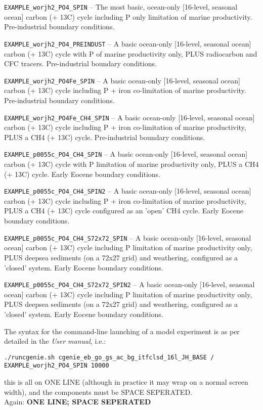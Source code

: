 \documentclass[10pt,twoside]{article}
\begin{document}
\begin{compactenum}

\item \texttt{EXAMPLE\_worjh2\_PO4\_SPIN} -- The most basic, ocean-only [16-level, seasonal ocean] carbon (+ 13C) cycle including P only limitation of marine productivity. Pre-industrial boundary conditions.
\item \texttt{EXAMPLE\_worjh2\_PO4\_PREINDUST} -- A basic ocean-only [16-level, seasonal ocean] carbon (+ 13C) cycle with P of marine productivity only, PLUS radiocarbon and CFC tracers. Pre-industrial boundary conditions.
\item \texttt{EXAMPLE\_worjh2\_PO4Fe\_SPIN} -- A basic ocean-only [16-level, seasonal ocean] carbon (+ 13C) cycle including P + iron co-limitation of marine productivity. Pre-industrial boundary conditions.
\item \texttt{EXAMPLE\_worjh2\_PO4Fe\_CH4\_SPIN} -- A basic ocean-only [16-level, seasonal ocean] carbon (+ 13C) cycle including P + iron co-limitation of marine productivity, PLUS a CH4 (+ 13C) cycle. Pre-industrial boundary conditions.
\item \texttt{EXAMPLE\_p0055c\_PO4\_CH4\_SPIN} -- A basic ocean-only [16-level, seasonal ocean] carbon (+ 13C) cycle with P limitation of marine productivity only, PLUS a CH4 (+ 13C) cycle. Early Eocene boundary conditions.
\item \texttt{EXAMPLE\_p0055c\_PO4\_CH4\_SPIN2} -- A basic ocean-only [16-level, seasonal ocean] carbon (+ 13C) cycle including P + iron co-limitation of marine productivity, PLUS a CH4 (+ 13C) cycle configured as an 'open' CH4 cycle. Early Eocene boundary conditions.
\item \texttt{EXAMPLE\_p0055c\_PO4\_CH4\_S72x72\_SPIN} -- A basic ocean-only [16-level, seasonal ocean] carbon (+ 13C) cycle including P limitation of marine productivity only, PLUS deepsea sediments (on a 72x27 grid) and weathering, configured as a 'closed' system. Early Eocene boundary conditions.
\item \texttt{EXAMPLE\_p0055c\_PO4\_CH4\_S72x72\_SPIN2} -- A basic ocean-only [16-level, seasonal ocean] carbon (+ 13C) cycle including P limitation of marine productivity only, PLUS deepsea sediments (on a 72x27 grid) and weathering, configured as a 'closed' system. Early Eocene boundary conditions.

\end{compactenum}

\noindent The syntax for the command-line launching of a model experiment is as per detailed in the \textit{User manual}, i.e.:
\vspace{-5pt}\begin{verbatim}./runcgenie.sh cgenie_eb_go_gs_ac_bg_itfclsd_16l_JH_BASE /
EXAMPLE_worjh2_PO4_SPIN 10000
\end{verbatim}\vspace{-5pt}
this is all on ONE LINE (although in practice it may wrap on a normal screen width), and the components must be SPACE SEPERATED.
\\Again: \textbf{ONE LINE; SPACE SEPERATED}
\end{document}
